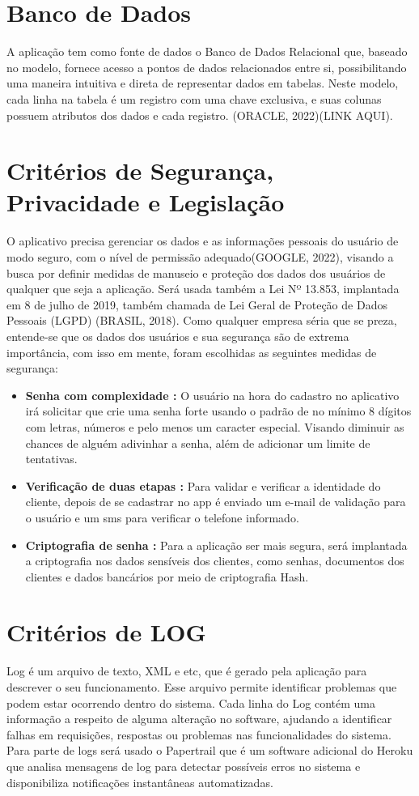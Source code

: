 \section{Banco de Dados}
A aplicação tem como fonte de dados o Banco de Dados Relacional que, baseado no modelo, fornece acesso a pontos de dados relacionados entre si, possibilitando uma maneira intuitiva e direta de representar dados em tabelas. Neste modelo, cada linha na tabela é um registro com uma chave exclusiva, e suas colunas possuem atributos dos dados e cada registro. (ORACLE, 2022)(LINK AQUI). 

\section{Critérios de Segurança, Privacidade e Legislação}
    O aplicativo precisa gerenciar os dados e as informações pessoais do usuário de modo seguro, com o nível de permissão adequado(GOOGLE, 2022), visando a busca por definir medidas de manuseio e proteção dos dados dos usuários de qualquer que seja a aplicação. Será usada também a Lei Nº 13.853, implantada em 8 de julho de 2019, também chamada de Lei Geral de Proteção de Dados Pessoais (LGPD) (BRASIL, 2018).
    Como qualquer empresa séria que se preza, entende-se que os dados dos usuários e sua segurança são de extrema importância, com isso em mente, foram escolhidas as seguintes medidas de segurança:
\begin{itemize}
    \item \textbf{Senha com complexidade :} 
    O usuário na hora do cadastro no aplicativo irá solicitar que crie uma senha forte usando o padrão de no mínimo 8 dígitos com letras, números e pelo menos um caracter especial. Visando diminuir as chances de alguém adivinhar a senha, além de adicionar um limite de tentativas.
    \item \textbf{Verificação de duas etapas :} 
    Para validar e verificar a identidade do cliente, depois de se cadastrar no app é enviado um e-mail de validação para o usuário e um sms para verificar o telefone informado.
    \item \textbf{Criptografia de senha :} 
    Para a aplicação ser mais segura, será implantada a criptografia nos dados sensíveis dos clientes, como senhas, documentos dos clientes e dados bancários por meio de criptografia Hash.
\end{itemize}

\section{Critérios de LOG}
    Log é um arquivo de texto, XML e etc, que é gerado pela aplicação para descrever o seu funcionamento. Esse arquivo permite identificar problemas que podem estar ocorrendo dentro do sistema.
    Cada linha do Log contém uma informação a respeito de alguma alteração no software, ajudando a identificar falhas em requisições, respostas ou problemas nas funcionalidades do sistema.
    Para parte de logs será usado o Papertrail que é um software adicional do Heroku que analisa mensagens de log para detectar possíveis erros no sistema e disponibiliza notificações instantâneas automatizadas. 

